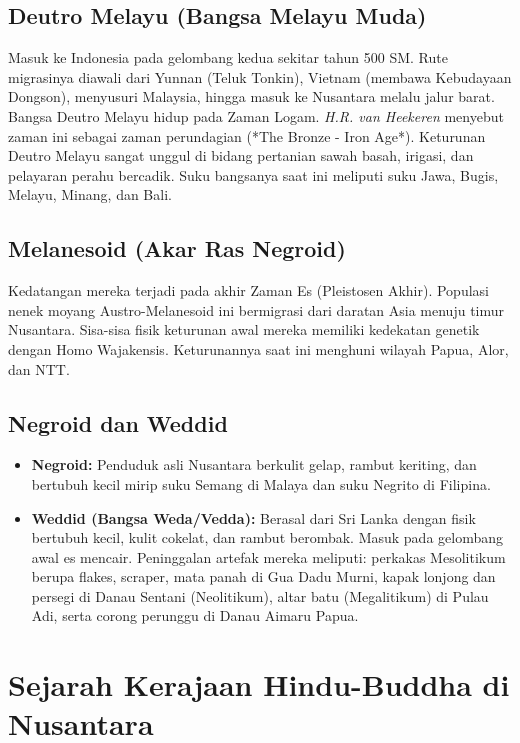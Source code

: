 \documentclass[12pt, a4paper]{article}
\begin{document}
\subsection{Deutro Melayu (Bangsa Melayu Muda)}
Masuk ke Indonesia pada gelombang kedua sekitar tahun 500 SM. Rute migrasinya diawali dari Yunnan (Teluk Tonkin), Vietnam (membawa Kebudayaan Dongson), menyusuri Malaysia, hingga masuk ke Nusantara melalu jalur barat. Bangsa Deutro Melayu hidup pada Zaman Logam. \textit{H.R. van Heekeren} menyebut zaman ini sebagai zaman perundagian (*The Bronze - Iron Age*). Keturunan Deutro Melayu sangat unggul di bidang pertanian sawah basah, irigasi, dan pelayaran perahu bercadik. Suku bangsanya saat ini meliputi suku Jawa, Bugis, Melayu, Minang, dan Bali.

\subsection{Melanesoid (Akar Ras Negroid)}
Kedatangan mereka terjadi pada akhir Zaman Es (Pleistosen Akhir). Populasi nenek moyang Austro-Melanesoid ini bermigrasi dari daratan Asia menuju timur Nusantara. Sisa-sisa fisik keturunan awal mereka memiliki kedekatan genetik dengan Homo Wajakensis. Keturunannya saat ini menghuni wilayah Papua, Alor, dan NTT.

\subsection{Negroid dan Weddid}
\begin{itemize}
	\item \textbf{Negroid:} Penduduk asli Nusantara berkulit gelap, rambut keriting, dan bertubuh kecil mirip suku Semang di Malaya dan suku Negrito di Filipina.
	\item \textbf{Weddid (Bangsa Weda/Vedda):} Berasal dari Sri Lanka dengan fisik bertubuh kecil, kulit cokelat, dan rambut berombak. Masuk pada gelombang awal es mencair. Peninggalan artefak mereka meliputi: perkakas Mesolitikum berupa flakes, scraper, mata panah di Gua Dadu Murni, kapak lonjong dan persegi di Danau Sentani (Neolitikum), altar batu (Megalitikum) di Pulau Adi, serta corong perunggu di Danau Aimaru Papua.
\end{itemize}

\section{Sejarah Kerajaan Hindu-Buddha di Nusantara}
\end{document}
